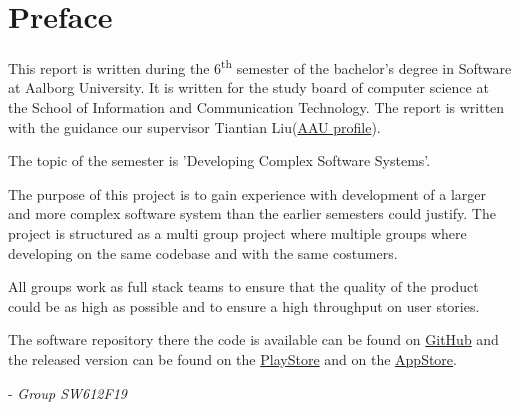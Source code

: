 \chapter*{Preface}
This report is written during the 6\textsuperscript{th} semester of the bachelor's degree in Software at Aalborg University.
It is written for the study board of computer science at the School of Information and Communication Technology.
The report is written with the guidance our supervisor Tiantian Liu(\href{http://personprofil.aau.dk/profil/145323}{AAU profile}).

The topic of the semester is 'Developing Complex Software Systems'.

The purpose of this project is to gain experience with development of a larger and more complex software system than the earlier semesters could justify.
The project is structured as a multi group project where multiple groups where developing on the same codebase and with the same costumers.

All groups work as full stack teams to ensure that the quality of the product could be as high as possible and to ensure a high throughput on user stories.

The software repository there the code is available can be found on \href{https://github.com/aau-giraf/}{GitHub} and the released version can be found on the \href{https://play.google.com/store/apps/details?id=dk.aau.cs.giraf.weekplanner}{PlayStore} and on the \href{https://github.com/aau-giraf}{AppStore}.

- \textit{Group SW612F19}

\newpage
